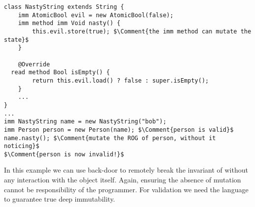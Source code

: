 \begin{itemize}
\begin{lstlisting}
class NastyString extends String {
	imm AtomicBool evil = new AtomicBool(false);
	imm method imm Void nasty() {
		this.evil.store(true); $\Comment{the imm method can mutate the state}$
	}

	@Override
  read method Bool isEmpty() {
		return this.evil.load() ? false : super.isEmpty();
	}
	...
}
...
imm NastyString name = new NastyString("bob");
imm Person person = new Person(name); $\Comment{person is valid}$
name.nasty(); $\Comment{mutate the ROG of person, without it noticing}$
$\Comment{person is now invalid!}$
\end{lstlisting}

In this example we can use \Q@NastyString@ back-door to remotely break the invariant of \Q@person@ without
any interaction with the \Q@person@ object itself.
Again, ensuring the absence of \Q@String@ mutation cannot be responsibility of the \Q@Person@ programmer.
For validation we need the language to guarantee true deep immutability.



\end{itemize}
